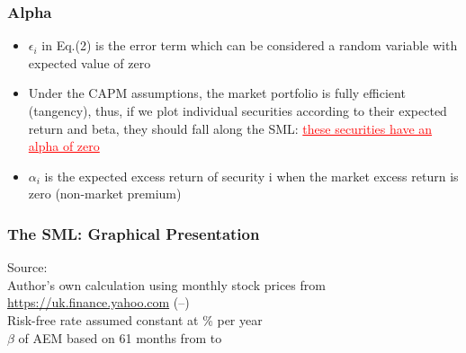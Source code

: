 \documentclass[9pt,aspectratio=169]{beamer}
\begin{document}
\begin{frame}

\frametitle{\textnormal{Alpha}}

\begin{itemize}
    \item $\epsilon_i$ in Eq.(2) is the error term which can be considered a random variable with expected value of zero
\item Under the CAPM assumptions, the market portfolio is fully efficient (tangency), thus, if we plot individual securities according to their expected return and beta, they should fall along the SML: \textcolor{red}{\underline {these securities have an alpha of zero}}
\item $\alpha_i$ is the expected excess return of security i when the market excess return is zero (non-market premium)

\end{itemize}
\end{frame}


\begin{frame}

\frametitle{\textnormal{The SML: Graphical Presentation}}

\begin{center}
    


\vspace{6pt}
\tiny {Source: 
\\
Author’s own calculation using monthly stock prices from \url{https://uk.finance.yahoo.com} (\LWindowFrom--\LWindowTo)
\\
Risk-free rate assumed constant at \LRiskFreePercent\% per year
\\
$\beta$ of AEM based on 61 months from \LAgnicoOldFrom{} to \LAgnicoOldTo
}

\end{center}



\end{frame}
\end{document}
